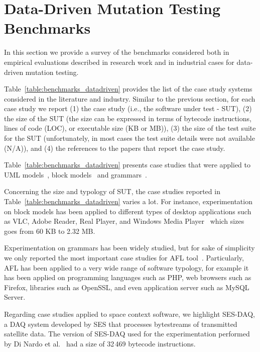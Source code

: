 \section{Data-Driven Mutation Testing Benchmarks}
\label{section:industry:data}

In this section we provide a survey of the benchmarks considered both in empirical evaluations described in research work and in industrial cases for data-driven mutation testing.

Table~\ref{table:benchmarks_datadriven} provides the list of the case study systems considered in the literature and industry. Similar to the previous section, for each case study we report (1) the case study (i.e., the software under test - SUT), (2) the size of the SUT (the size can be expressed in terms of bytecode instructions, lines of code (LOC), or executable size (KB or MB)), (3) the size of the test suite for the SUT (unfortunately, in most cases the test suite details were not available (N/A)), and (4) the references to the papers that report the case study.

Table~\ref{table:benchmarks_datadriven} presents case studies that were applied to UML models~\cite{di2017augmenting}, block models~\cite{pham2016model} and grammars~\cite{AFL:industrialcases}.

Concerning the size and typology of SUT, the case studies reported in Table~\ref{table:benchmarks_datadriven} varies a lot.
For instance, experimentation on block models has been applied to different types of desktop applications such as VLC, Adobe Reader, Real Player, and Windows Media Player~\cite{pham2016model} which sizes goes from 60 KB to 2.32 MB. 

Experimentation on grammars has been widely studied, but for sake of simplicity we only reported the most important case studies for AFL tool~\cite{AFL:industrialcases}. Particularly, AFL has been applied to a very wide range of software typology, for example it has been applied on programming languages such as PHP, web browsers such as Firefox, libraries such as OpenSSL, and even application server such as MySQL Server. 

Regarding case studies applied to space context software, we highlight SES-DAQ, a DAQ system developed by SES that processes bytestreams of transmitted satellite data. The version of SES-DAQ used for the experimentation performed by Di Nardo et al.~\cite{di2017augmenting} had a size of 32\,469 bytecode instructions.





